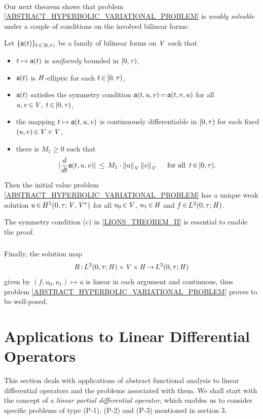 \documentclass[11pt,twoside]{article}
\begin{document}
\paragraph{}
Our next theorem shows that
problem \ref{ABSTRACT_HYPERBOLIC_VARIATIONAL_PROBLEM}
is \textit{weakly solvable} under a couple of conditions
on the involved bilinear forms:

\begin{theorem1}\label{LIONS_THEOREM_II}
Let $\{\mathfrak{a}(t)\}_{t {\,\in\,} [0,\tau)}$ be a family
of bilinear forms on $\mathit{V}$ such that

\begin{itemize}[leftmargin=9mm]
\item[(a)]
$t \mapsto \mathfrak{a}(t)$ is \textit{uniformly} bounded in $[0,\tau)$,

\item[(b)]
$\mathfrak{a}(t)$ is $\mathit{H}$-elliptic for each $t {\,\in\,} [0,\tau)$,

\item[(c)]
$\mathfrak{a}(t)$ satisfies the symmetry condition
$\mathfrak{a}(t,u,v) {\,=\,} \mathfrak{a}(t,v,u)$
for all $u,v {\,\in\,} \mathit{V}, \; t {\,\in\,} [0,\tau)$,

\item[(d)]
the mapping $t \mapsto \mathfrak{a}(t,u,v)$ is continuously differentiable in $[0,\tau)$
for each fixed $(u,v) {\,\in\,} \mathit{V} {\,\times\,} \mathit{V}$,

\item[(e)]
there is $M_1 \geq 0$ such that
\[
\abs{ \frac{d}{dt} \sql(t,u,v)} \, \leq \, 
M_1 \cdot \norm{u}_{\vecV} \norm{v}_{\vecV}
\qfa \, t \xeof [0,\T).
\]
\end{itemize}
Then the initial value problem \eqref{ABSTRACT_HYPERBOLIC_VARIATIONAL_PROBLEM}
has a unique weak solution $u {\,\in\,} H^1(0,\tau;\mathit{V},\mathit{V}^*)$
for all $u_0 {\,\in\,} \mathit{V}$,
        $u_1 {\,\in\,} \mathit{H}$ and
        $f {\,\in\,} L^2(0,\tau;\mathit{H})$.
\end{theorem1}

The symmetry condition (c) in \ref{LIONS_THEOREM_II} is essential
to enable the proof.

\subparagraph{}
Finally,
the solution map
\[
R{\,:\,}L^2(0,\tau;\mathit{H}) {\,\times\,} \mathit{V} {\,\times\,} \mathit{H} {\,\to\,} L^2(0,\tau;\mathit{H})
\]
given by $(f,u_0,u_1) \mapsto u$ is linear in each argument and continuous,
thus problem \eqref{ABSTRACT_HYPERBOLIC_VARIATIONAL_PROBLEM} proves
to be well-posed.

\section{Applications to Linear Differential Operators}                        %
This section deals with applications of abstract functional analysis
to linear differential operators and the problems associated with them.
We shall start with the concept
of a \textit{linear partial differential operator},
which enables us to consider specific problems of type (P-1), (P-2) and (P-3)
mentioned in section 3.
\end{document}
